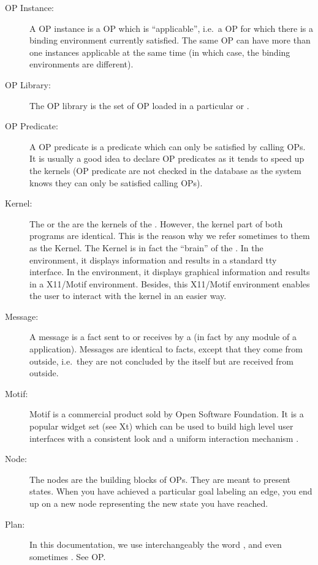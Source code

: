 \begin{description}
\item[OP Instance:] A OP instance is a OP which is ``applicable'', i.e.\ a OP
for which there is a binding environment currently satisfied. The same OP can
have more than one instances applicable at the same time (in which case, the
binding environments are different).

\item[OP Library:] The OP library is the set of OP loaded in a particular \CPK{}
or \XPK{}.

\item[OP Predicate:] A OP predicate is a predicate which can only be satisfied
by calling OPs. It is usually a good idea to declare OP predicates as it tends
to speed up the kernels (OP predicate are not checked in the database as the
system knows they can only be satisfied calling OPs).

\item[Kernel:] The \CPK{} or the \XPK{} are the kernels of the \COPRSDE{}.
However, the kernel part of both programs are identical. This is the reason why
we refer sometimes to them as the Kernel. The Kernel is in fact the ``brain''
of the \COPRSDE{}. In the \CPK{} environment, it displays information and
results in a standard tty interface. In the \XPK{} environment, it displays
graphical information and results in a X11/Motif environment. Besides, this
X11/Motif environment enables the user to interact with the kernel in an easier
way.

\item[Message:] A message is a fact sent to or receives by a \PK{} (in fact by
any module of a \COPRS{} application). Messages are identical to facts, except
that they come from outside, i.e.\ they are not concluded by the \PK{} itself
but are received from outside.

\item[Motif:] Motif is a commercial product sold by Open Software
Foundation. It is a popular widget set (see Xt) which can be used to
build high level user interfaces with a consistent look and a uniform
interaction mechanism \cite{Motif-manual}.

\item[Node:] The nodes are the building blocks of OPs. They are meant to
present states. When you have achieved a particular goal labeling an edge, you
end up on a new node representing the new state you have reached. 

\item[Plan:] In this documentation, we use interchangeably the
word ,  and even sometimes . See OP.


\end{description}
